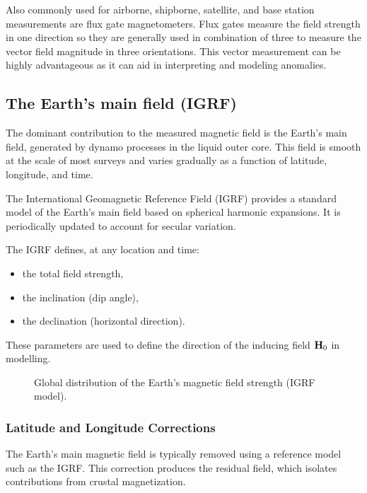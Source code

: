 Also commonly used for airborne, shipborne, satellite, and base station measurements are flux gate magnetometers.  Flux gates measure the field strength in one direction so they are generally used in combination of three to measure the vector field magnitude in three orientations.  This vector measurement can be highly advantageous as it can aid in interpreting and modeling anomalies.

\subsection{The Earth's main field (IGRF)}

The dominant contribution to the measured magnetic field is the Earth's main field, generated by dynamo processes in the liquid outer core. This field is smooth at the scale of most surveys and varies gradually as a function of latitude, longitude, and time.

The International Geomagnetic Reference Field (IGRF) provides a standard model of the Earth's main field based on spherical harmonic expansions. It is periodically updated to account for secular variation.

The IGRF defines, at any location and time:
\begin{itemize}
    \item the total field strength,
    \item the inclination (dip angle),
    \item the declination (horizontal direction).
\end{itemize}

These parameters are used to define the direction of the inducing field $\vb{H}_0$ in modelling.

\begin{figure}[hbt]
  \centering
  \caption{Global distribution of the Earth's magnetic field strength (IGRF model).}
  \label{fig:igrf}
\end{figure}

\subsubsection{Latitude and Longitude Corrections}

The Earth's main magnetic field is typically removed using a reference model such as the IGRF.  This correction produces the residual field, which isolates contributions from crustal magnetization.


